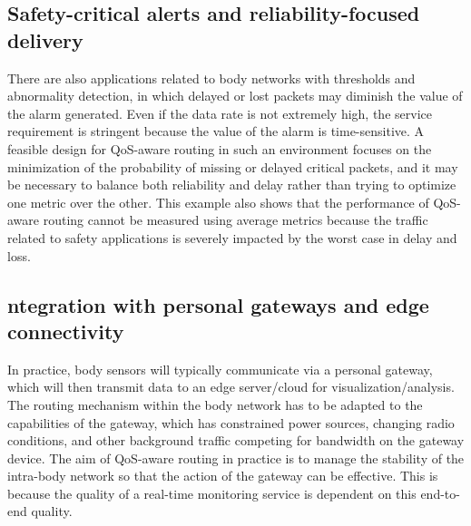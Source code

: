 \documentclass[12pt]{article}
\begin{document}
    \subsection{Safety-critical alerts and reliability-focused delivery}
    There are also applications related to body networks with thresholds and abnormality detection, in which delayed or lost packets may diminish the value of the alarm generated. Even if the data rate is not extremely high, the service requirement is stringent because the value of the alarm is time-sensitive. A feasible design for QoS-aware routing in such an environment focuses on the minimization of the probability of missing or delayed critical packets, and it may be necessary to balance both reliability and delay rather than trying to optimize one metric over the other. This example also shows that the performance of QoS-aware routing cannot be measured using average metrics because the traffic related to safety applications is severely impacted by the worst case in delay and loss.
	\subsection{ntegration with personal gateways and edge connectivity}
    In practice, body sensors will typically communicate via a personal gateway, which will then transmit data to an edge server/cloud for visualization/analysis. The routing mechanism within the body network has to be adapted to the capabilities of the gateway, which has constrained power sources, changing radio conditions, and other background traffic competing for bandwidth on the gateway device. The aim of QoS-aware routing in practice is to manage the stability of the intra-body network so that the action of the gateway can be effective. This is because the quality of a real-time monitoring service is dependent on this end-to-end quality.
\end{document}

